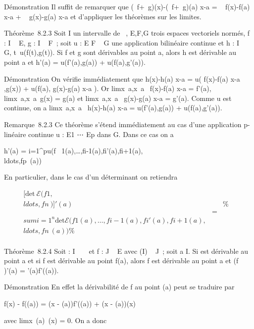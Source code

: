 Démonstration Il suffit de remarquer que  (\alpha~f+\beta~g)(x)-(\alpha~f+\beta~g)(a)
\over x-a = \alpha~ f(x)-f(a) \over x-a +
\beta~ g(x)-g(a) \over x-a et d'appliquer les théorèmes
sur les limites.

Théorème~8.2.3 Soit I un intervalle de ~, E,F,G trois espaces vectoriels
normés, f : I \rightarrow~ E, g : I \rightarrow~ F~; soit u : E \times F \rightarrow~ G une application
bilinéaire continue et h : I \rightarrow~ G,
t\mapsto~u(f(t),g(t)). Si f et g sont dérivables au
point a, alors h est dérivable au point a et h'(a) = u(f'(a),g(a)) +
u(f(a),g'(a)).

Démonstration On vérifie immédiatement que  h(x)-h(a)
\over x-a = u( f(x)-f(a) \over x-a
,g(x)) + u(f(a), g(x)-g(a) \over x-a ). Or
limx\rightarrow~a,x\neq~a~
f(x)-f(a) \over x-a = f'(a),
limx\rightarrow~a,x\neq~a~g(x)
= g(a) et
limx\rightarrow~a,x\neq~a~
g(x)-g(a) \over x-a = g'(a). Comme u est continue, on a
limx\rightarrow~a,x\neq~a~
h(x)-h(a) \over x-a = u(f'(a),g(a)) + u(f(a),g'(a)).

Remarque~8.2.3 Ce théorème s'étend immédiatement au cas d'une
application p-linéaire continue u : E1
\times⋯ \times Ep dans G. Dans ce cas on a

h'(a) = \sum i=1^pu(f~
1(a),\ldots,fi-1(a),fi'(a),fi+1(a),\\ldots,fp~(a))

En particulier, dans le cas d'un déterminant on retiendra

\begin{align*}
{[}\mathrm{det}~
\mathcal{E}(f1,\\ldots,fn~){]}'(a)&&
\%& \\ & =& \\sum
i=1^n \mathrm{det} 
\mathcal{E}(f1(a),\ldots,fi-1(a),fi'(a),fi+1(a),\\ldots,fn~(a))\%&
\\ \end{align*}

Théorème~8.2.4 Soit \phi : I \rightarrow~ ~ et f : J \rightarrow~ E avec \phi(I) \subset~ J~; soit a \in I.
Si \phi est dérivable au point a et si f est dérivable au point f(a), alors
f \cdot \phi est dérivable au point a et (f \cdot \phi)'(a) = \phi'(a)f'(\phi(a)).

Démonstration En effet la dérivabilité de f au point \phi(a) peut se
traduire par

f(x) - f(\phi(a)) = (x - \phi(a))f'(\phi(a)) + (x - \phi(a))\epsilon(x)

avec limx\rightarrow~\phi(a)~\epsilon(x) = 0. On a donc

